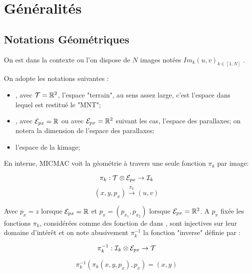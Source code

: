 \chapter{G\'en\'eralit\'es}


\section{Notations G\'eom\'etriques}

On est dans la contexte ou l'on dispose de $N$ images
not\'ees $Im_k(u,v)_{k\in [1,N]}$ .

On adopte les notations suivantes :

\begin{itemize}
   \item \ETer,  avec  $\ETer = \RR ^2$, l'espace "terrain", au sens assez large,
         c'est l'espace dans lequel est restitu\'e le "MNT";

   \item \EPx, avec  $\EPx = \RR$ ou avec  $\EPx = \RR ^2$ suivant les cas,
         l'espace des parallaxes; on notera \DimPx la dimension de l'espace
         des parallaxes;

   \item \EIm l'espace de la k\EME image;
\end{itemize}

En interne, MICMAC voit la g\'eom\'etrie  \`a travers une seule
fonction $\pi_k$ par image:

\begin{equation}
   \pi_k :   \ETer \otimes \EPx \rightarrow \EIm
\end{equation}
\begin{equation}
              (x,y,p_x)  \stackrel{\pi_k}{\rightarrow}  (u,v)
\end{equation}

Avec $p_x=z$ lorsque $\EPx = \RR$ et   $p_x=(p_{x_1},p_{x_2})$
lorsque $\EPx = \RR^2$. A  $p_x$ fix\'ee les fonctions $\pi_k$,
 consid\'er\'ees comme des fonction de \ETer dans  \EIm,
sont injectives sur leur domaine d'int\'er\^et et on note
abusivement  $\pi_k^{-1}$ la fonction "inverse" d\'efinie par  :

\begin{equation}
   \pi_k^{-1} :   \EIm \otimes \EPx \rightarrow \ETer
\end{equation}

\begin{equation}
   \pi_k^{-1}(\pi_k(x,y,p_x),p_x) = (x,y)
\end{equation}


